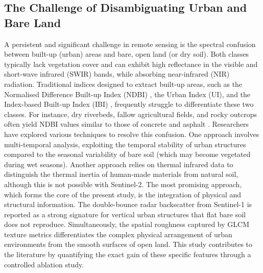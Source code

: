 \documentclass[conference]{IEEEtran}
\begin{document}
\subsection{The Challenge of Disambiguating Urban and Bare Land}
A persistent and significant challenge in remote sensing is the spectral confusion between built-up (urban) areas and bare, open land (or dry soil). Both classes typically lack vegetation cover and can exhibit high reflectance in the visible and short-wave infrared (SWIR) bands, while absorbing near-infrared (NIR) radiation.
Traditional indices designed to extract built-up areas, such as the Normalised Difference Built-up Index (NDBI) \cite{r21}, the Urban Index (UI), and the Index-based Built-up Index (IBI) \cite{r23}, frequently struggle to differentiate these two classes. For instance, dry riverbeds, fallow agricultural fields, and rocky outcrops often yield NDBI values similar to those of concrete and asphalt \cite{r26}.
Researchers have explored various techniques to resolve this confusion. One approach involves multi-temporal analysis, exploiting the temporal stability of urban structures compared to the seasonal variability of bare soil (which may become vegetated during wet seasons). Another approach relies on thermal infrared data to distinguish the thermal inertia of human-made materials from natural soil, although this is not possible with Sentinel-2.
The most promising approach, which forms the core of the present study, is the integration of physical and structural information. The double-bounce radar backscatter from Sentinel-1 is reported as a strong signature for vertical urban structures that flat bare soil does not reproduce. Simultaneously, the spatial roughness captured by GLCM texture metrics differentiates the complex physical arrangement of urban environments from the smooth surfaces of open land. This study contributes to the literature by quantifying the exact gain of these specific features through a controlled ablation study.
\end{document}
